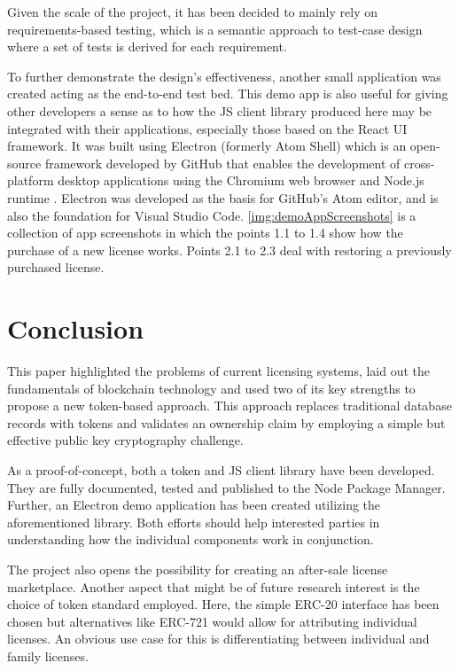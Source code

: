 \documentclass{egpubl}
\begin{document}
Given the scale of the project, it has been decided to mainly rely on requirements-based testing, which is a semantic approach to test-case design where a set of tests is derived for each requirement.

To further demonstrate the design's effectiveness, another small application was created acting as the end-to-end test bed. This demo app is also useful for giving other developers a sense as to how the JS client library produced here may be integrated with their applications, especially those based on the React UI framework. It was built using Electron (formerly Atom Shell) which is an open-source framework developed by GitHub that enables the development of cross-platform desktop applications using the Chromium web browser and Node.js runtime \cite{electron}. Electron was developed as the basis for GitHub's Atom editor, and is also the foundation for Visual Studio Code. \autoref{img:demoAppScreenshots} is a collection of app screenshots in which the points 1.1 to 1.4 show how the purchase of a new license works. Points 2.1 to 2.3 deal with restoring a previously purchased license.


\section{Conclusion}
This paper highlighted the problems of current licensing systems, laid out the fundamentals of blockchain technology and used two of its key strengths to propose a new token-based approach. This approach replaces traditional database records with tokens and validates an ownership claim by employing a simple but effective public key cryptography challenge.

As a proof-of-concept, both a token and JS client library have been developed. They are fully documented, tested and published to the Node Package Manager. Further, an Electron demo application has been created utilizing the aforementioned library. Both efforts should help interested parties in understanding how the individual components work in conjunction. 

The project also opens the possibility for creating an after-sale license marketplace. Another aspect that might be of future research interest is the choice of token standard employed. Here, the simple ERC-20 interface has been chosen but alternatives like ERC-721 would allow for attributing individual licenses. An obvious use case for this is differentiating between individual and family licenses.
\end{document}

